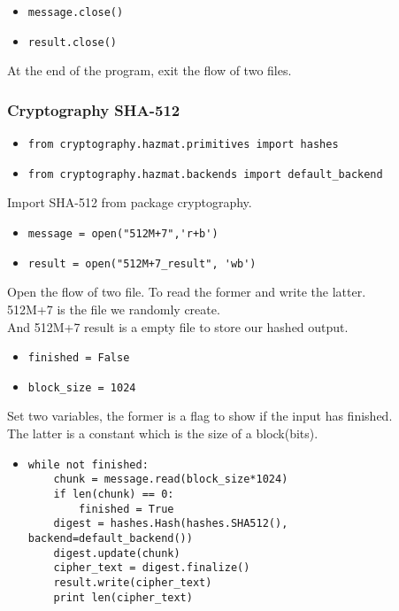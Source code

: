 \documentclass{article}
\begin{document}
\begin{itemize}
\item \verb|message.close()|
\item \verb|result.close()|
\end{itemize}

\noindent At the end of the program, exit the flow of two files.\\

\subsubsection{Cryptography SHA-512}

\begin{itemize}
\item \verb|from cryptography.hazmat.primitives import hashes|
\item \verb|from cryptography.hazmat.backends import default_backend|
\end{itemize}

\noindent Import SHA-512 from package cryptography.

\begin{itemize}
\item \verb|message = open("512M+7",'r+b')|
\item \verb|result = open("512M+7_result", 'wb')|
\end{itemize}
 
\noindent Open the flow of two file. To read the former and write the latter.\\
512M+7 is the file we randomly create.\\
And 512M+7 result is a empty file to store our hashed output.

\begin{itemize}
\item \verb|finished = False|
\item \verb|block_size = 1024|
\end{itemize}

\noindent Set two variables, the former is a flag to show if the input has finished.\\
The latter is a constant which is the size of a block(bits).

\begin{itemize}
\item \begin{verbatim}while not finished:
    chunk = message.read(block_size*1024)
    if len(chunk) == 0:
        finished = True
    digest = hashes.Hash(hashes.SHA512(), backend=default_backend())
    digest.update(chunk)
    cipher_text = digest.finalize()
    result.write(cipher_text)
    print len(cipher_text)
\end{verbatim}
\end{itemize}
\end{document}
